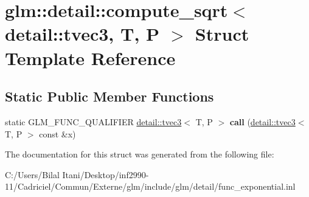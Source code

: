 \hypertarget{structglm_1_1detail_1_1compute__sqrt_3_01detail_1_1tvec3_00_01_t_00_01_p_01_4}{}\section{glm\+:\+:detail\+:\+:compute\+\_\+sqrt$<$ detail\+:\+:tvec3, T, P $>$ Struct Template Reference}
\label{structglm_1_1detail_1_1compute__sqrt_3_01detail_1_1tvec3_00_01_t_00_01_p_01_4}
\subsection*{Static Public Member Functions}
\begin{DoxyCompactItemize}
\item 
static G\+L\+M\+\_\+\+F\+U\+N\+C\+\_\+\+Q\+U\+A\+L\+I\+F\+I\+ER \hyperlink{structglm_1_1detail_1_1tvec3}{detail\+::tvec3}$<$ T, P $>$ {\bfseries call} (\hyperlink{structglm_1_1detail_1_1tvec3}{detail\+::tvec3}$<$ T, P $>$ const \&x)\hypertarget{structglm_1_1detail_1_1compute__sqrt_3_01detail_1_1tvec3_00_01_t_00_01_p_01_4_a18a51ad87ca9848b797060c14651dafe}{}\label{structglm_1_1detail_1_1compute__sqrt_3_01detail_1_1tvec3_00_01_t_00_01_p_01_4_a18a51ad87ca9848b797060c14651dafe}

\end{DoxyCompactItemize}


The documentation for this struct was generated from the following file\+:\begin{DoxyCompactItemize}
\item 
C\+:/\+Users/\+Bilal Itani/\+Desktop/inf2990-\/11/\+Cadriciel/\+Commun/\+Externe/glm/include/glm/detail/func\+\_\+exponential.\+inl\end{DoxyCompactItemize}
